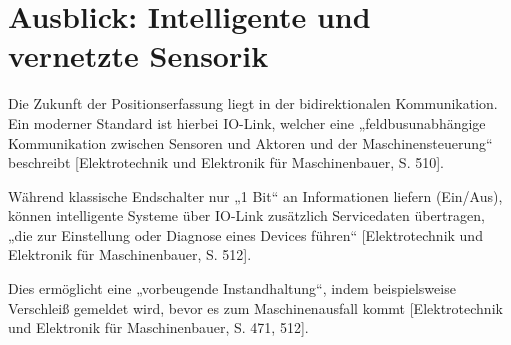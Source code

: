 \section{Ausblick: Intelligente und vernetzte Sensorik}

Die Zukunft der Positionserfassung liegt in der bidirektionalen Kommunikation. Ein moderner Standard ist hierbei IO-Link, welcher eine „feldbusunabhängige Kommunikation zwischen Sensoren und Aktoren und der Maschinensteuerung“ beschreibt [Elektrotechnik und Elektronik für Maschinenbauer, S. 510].

Während klassische Endschalter nur „1 Bit“ an Informationen liefern (Ein/Aus), können intelligente Systeme über IO-Link zusätzlich Servicedaten übertragen, „die zur Einstellung oder Diagnose eines Devices führen“ [Elektrotechnik und Elektronik für Maschinenbauer, S. 512].

Dies ermöglicht eine „vorbeugende Instandhaltung“, indem beispielsweise Verschleiß gemeldet wird, bevor es zum Maschinenausfall kommt [Elektrotechnik und Elektronik für Maschinenbauer, S. 471, 512].